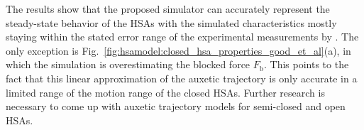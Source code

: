 


The results show that the proposed simulator can accurately represent the steady-state behavior of the \glspl{HSA} with the simulated characteristics mostly staying within the stated error range of the experimental measurements by \citet{good2022expanding}. The only exception is Fig.~\ref{fig:hsamodel:closed_hsa_properties_good_et_al}(a), in which the simulation is overestimating the blocked force $F_\mathrm{b}$. This points to the fact that this linear approximation of the auxetic trajectory is only accurate in a limited range of the motion range of the closed \glspl{HSA}. Further research is necessary to come up with auxetic trajectory models for semi-closed and open \glspl{HSA}.

